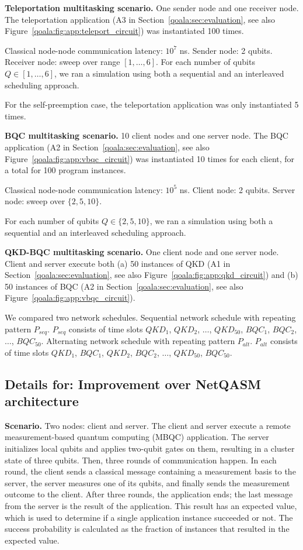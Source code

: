 \textbf{Teleportation multitasking scenario.}
One sender node and one receiver node.
The teleportation application (A3 in Section~\ref{qoala:sec:evaluation}, see also Figure~\ref{qoala:fig:app:teleport_circuit}) was instantiated 100 times.

Classical node-node communication latency: $10^7$ ns.
Sender node: 2 qubits.
Receiver node: sweep over range $[1, \dots, 6]$.
For each number of qubits $Q \in [1, \dots, 6]$, we ran a simulation using both a sequential and an interleaved scheduling approach.

For the self-preemption case, the teleportation application was only instantiated 5 times.

\textbf{BQC multitasking scenario.}
10 client nodes and one server node.
The BQC application (A2 in Section~\ref{qoala:sec:evaluation}, see also Figure~\ref{qoala:fig:app:vbqc_circuit}) was instantiated 10 times for each client, for a total for 100 program instances.

Classical node-node communication latency: $10^5$ ns.
Client node: 2 qubits.
Server node: sweep over $\{2, 5, 10\}$.

For each number of qubits $Q \in \{2, 5, 10\}$, we ran a simulation using both a sequential and an interleaved scheduling approach.

\textbf{QKD-BQC multitasking scenario.}
One client node and one server node.
Client and server execute both (a) 50 instances of QKD (A1 in Section~\ref{qoala:sec:evaluation}, see also Figure~\ref{qoala:fig:app:qkd_circuit}) and (b) 50 instances of BQC (A2 in Section~\ref{qoala:sec:evaluation}, see also Figure~\ref{qoala:fig:app:vbqc_circuit}).

We compared two network schedules.
Sequential network schedule with repeating pattern $P_{seq}$. $P_{seq}$ consists of time slots $QKD_1$, $QKD_2$, $\dots$, $QKD_{50}$, $BQC_1$, $BQC_2$, $\dots$, $BQC_{50}$.
Alternating network schedule with repeating pattern $P_{alt}$. $P_{alt}$ consists of time slots $QKD_1$, $BQC_1$, $QKD_2$, $BQC_2$, $\dots$, $QKD_{50}$, $BQC_{50}$.

\subsection{Details for: Improvement over NetQASM architecture}

\textbf{Scenario.}
Two nodes: client and server.
The client and server execute a remote measurement-based quantum computing (MBQC) application.
The server initializes local qubits and applies two-qubit gates on them, resulting in a cluster state of three qubits.
Then, three rounds of communication happen.
In each round, the client sends a classical message containing a measurement basis to the server, the server measures one of its qubits, and finally sends the measurement outcome to the client.
After three rounds, the application ends; the last message from the server is the result of the application.
This result has an expected value, which is used to determine if a single application instance succeeded or not.
The success probability is calculated as the fraction of instances that resulted in the expected value.

